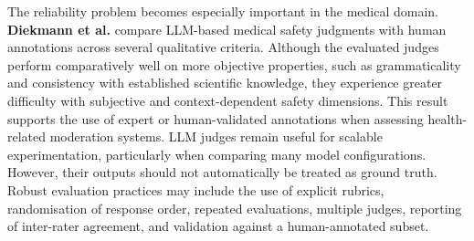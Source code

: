 \documentclass[11pt,a4paper]{article}
\begin{document}
The reliability problem becomes especially important in the medical domain. \textbf{Diekmann et al.} \cite{diekmann2025medicaljudges} compare LLM-based medical safety judgments with human annotations across several qualitative criteria. Although the evaluated judges perform comparatively well on more objective properties, such as grammaticality and consistency with established scientific knowledge, they experience greater difficulty with subjective and context-dependent safety dimensions. This result supports the use of expert or human-validated annotations when assessing health-related moderation systems.
LLM judges remain useful for scalable experimentation, particularly when comparing many model configurations. However, their outputs should not automatically be treated as ground truth. Robust evaluation practices may include the use of explicit rubrics, randomisation of response order, repeated evaluations, multiple judges, reporting of inter-rater agreement, and validation against a human-annotated subset.
\end{document}
